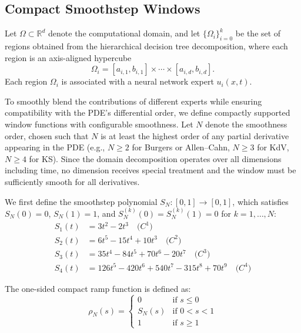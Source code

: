 \vspace{0.5em}

\subsection{Compact Smoothstep Windows}
\label{sec:smoothstep_windows}

Let $\Omega \subset \mathbb{R}^d$ denote the computational domain, and let
$\{\Omega_i\}_{i=0}^{k}$ be the set of regions obtained from the hierarchical
decision tree decomposition, where each region is an axis-aligned hypercube
\[
\Omega_i = [a_{i,1}, b_{i,1}] \times \cdots \times [a_{i,d}, b_{i,d}].
\]
Each region $\Omega_i$ is associated with a neural network expert $u_i(x,t)$.

\noindent To smoothly blend the contributions of different experts while ensuring
compatibility with the PDE's differential order, we define compactly supported
window functions with configurable smoothness. Let $N$ denote the smoothness
order, chosen such that $N$ is at least the highest order of any partial
derivative appearing in the PDE (e.g., $N \geq 2$ for Burgers or Allen--Cahn,
$N \geq 3$ for KdV, $N \geq 4$ for KS). Since the domain decomposition
operates over all dimensions including time, no dimension receives special
treatment and the window must be sufficiently smooth for all derivatives.

\noindent We first define the smoothstep polynomial $S_N : [0,1] \to [0,1]$, which
satisfies $S_N(0) = 0$, $S_N(1) = 1$, and $S_N^{(k)}(0) = S_N^{(k)}(1) = 0$
for $k = 1, \ldots, N$:
\begin{align}
S_1(t) &= 3t^2 - 2t^3 \quad \text{($C^1$)} \\
S_2(t) &= 6t^5 - 15t^4 + 10t^3 \quad \text{($C^2$)} \\
S_3(t) &= 35t^4 - 84t^5 + 70t^6 - 20t^7 \quad \text{($C^3$)} \\
S_4(t) &= 126t^5 - 420t^6 + 540t^7 - 315t^8 + 70t^9 \quad \text{($C^4$)}
\end{align}

\noindent The one-sided compact ramp function is defined as:
\begin{equation}
\rho_N(s) = \begin{cases}
0 & \text{if } s \leq 0 \\
S_N(s) & \text{if } 0 < s < 1 \\
1 & \text{if } s \geq 1
\end{cases}
\end{equation}

